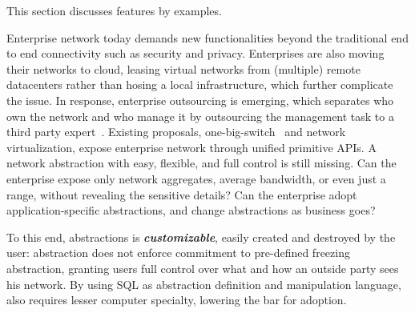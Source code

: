 
\noindent{}This section discusses \Sys features by examples. 


 Enterprise network today demands
new functionalities beyond the traditional end to end connectivity
such as security and privacy.
Enterprises are also moving their networks to cloud, leasing virtual
networks from (multiple) remote datacenters rather than hosing a local
infrastructure, which further complicate the issue. In response,
enterprise outsourcing is emerging, which separates who own the
network and who manage it by outsourcing the management task to a
third party
expert~\cite{middlebox-outsourcing,platform-service-model}. Existing
proposals, \eg
one-big-switch~\cite{platform-service-model,optimize-obs} and network
virtualization, expose enterprise network through unified primitive
APIs. %
A network abstraction with easy, flexible, and full control is still
missing. Can the enterprise expose only network aggregates, \eg
average bandwidth, or even just a range, without revealing the
sensitive details?  Can the enterprise adopt application-specific
abstractions, and change abstractions as business goes?

To this end, \Sys abstractions is \textit{\textbf{customizable}},
easily created and destroyed by the user: \Sys abstraction does not
enforce commitment to pre-defined freezing abstraction, granting users
full control over what and how an outside party sees his network. By
using SQL as abstraction definition and manipulation language,
\Sys also requires lesser computer specialty, lowering the bar for
adoption.


